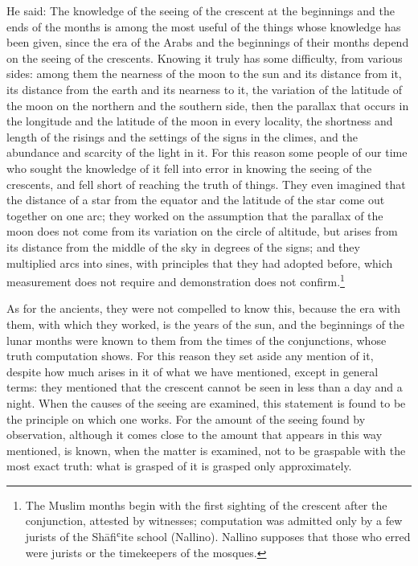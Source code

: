 \documentclass[11pt]{article}
\begin{document}
\par He said: The knowledge of the seeing of the crescent at the beginnings and the ends of the months is among the most useful of the things whose knowledge has been given, since the era of the Arabs and the beginnings of their months depend on the seeing of the crescents. Knowing it truly has some difficulty, from various sides: among them the nearness of the moon to the sun and its distance from it, its distance from the earth and its nearness to it, the variation of the latitude of the moon on the northern and the southern side, then the parallax that occurs in the longitude and the latitude of the moon in every locality, the shortness and length of the risings and the settings of the signs in the climes, and the abundance and scarcity of the light in it. For this reason some people of our time who sought the knowledge of it fell into error in knowing the seeing of the crescents, and fell short of reaching the truth of things. They even imagined that the distance of a star from the equator and the latitude of the star come out together on one arc; they worked on the assumption that the parallax of the moon does not come from its variation on the circle of altitude, but arises from its distance from the middle of the sky in degrees of the signs; and they multiplied arcs into sines, with principles that they had adopted before, which measurement does not require and demonstration does not confirm.\footnote{The Muslim months begin with the first sighting of the crescent after the conjunction, attested by witnesses; computation was admitted only by a few jurists of the Shāfiʿite school (Nallino). Nallino supposes that those who erred were jurists or the timekeepers of the mosques.}\par
\par As for the ancients, they were not compelled to know this, because the era with them, with which they worked, is the years of the sun, and the beginnings of the lunar months were known to them from the times of the conjunctions, whose truth computation shows. For this reason they set aside any mention of it, despite how much arises in it of what we have mentioned, except in general terms: they mentioned that the crescent cannot be seen in less than a day and a night. When the causes of the seeing are examined, this statement is found to be the principle on which one works. For the amount of the seeing found by observation, although it comes close to the amount that appears in this way mentioned, is known, when the matter is examined, not to be graspable with the most exact truth: what is grasped of it is grasped only approximately.\par
\end{document}
